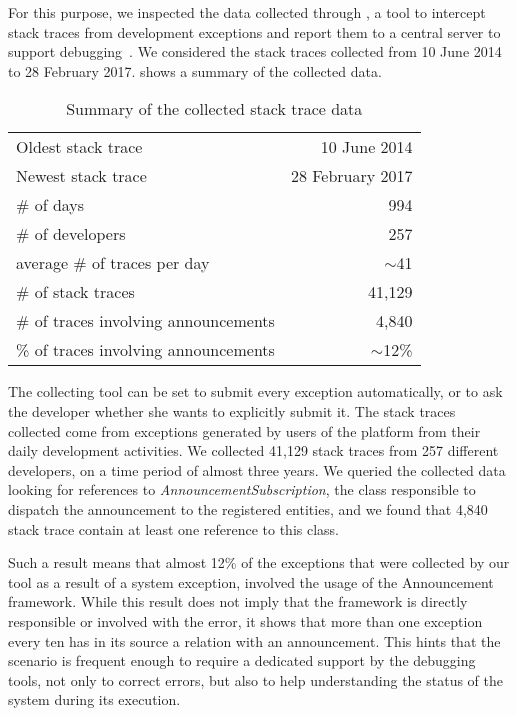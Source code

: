 For this purpose, we inspected the data collected through \sln, a tool to intercept stack traces from development exceptions and report them to a central server to support debugging~\cite{DalS2015a}.
We considered the stack traces collected from 10 June 2014 to 28 February 2017.
 shows a summary of the collected data.

\begin{table}[h]
\centering
\caption{Summary of the collected stack trace data}
\begin{tabular}{lr}
\hline
Oldest stack trace & 10 June 2014 \\
Newest stack trace & 28 February 2017 \\
\# of days & 994\\
\# of developers & 257\\
average \# of traces per day & $\sim$41\\
\# of stack traces & 41,129 \\
\# of traces involving announcements & 4,840 \\
\% of traces involving announcements & $\sim$12\% \\
\hline
\end{tabular}
\label{tab:stack-traces}
\end{table}


The collecting tool can be set to submit every exception automatically, or to ask the developer whether she wants to explicitly submit it.
The stack traces collected come from exceptions generated by users of the \pha platform from their daily development activities.
We collected 41,129 stack traces from 257 different developers, on a time period of almost three years.
We queried the collected data looking for references to \textit{AnnouncementSubscription}, the class responsible to dispatch the announcement to the registered entities, and we found that 4,840 stack trace contain at least one reference to this class.

Such a result means that almost 12\% of the exceptions that were collected by our tool as a result of a system exception, involved the usage of the Announcement framework.
While this result does not imply that the framework is directly responsible or involved with the error, it shows that more than one exception every ten has in its source a relation with an announcement.
This hints that the scenario is frequent enough to require a dedicated support by the debugging tools, not only to correct errors, but also to help understanding the status of the system during its execution.


